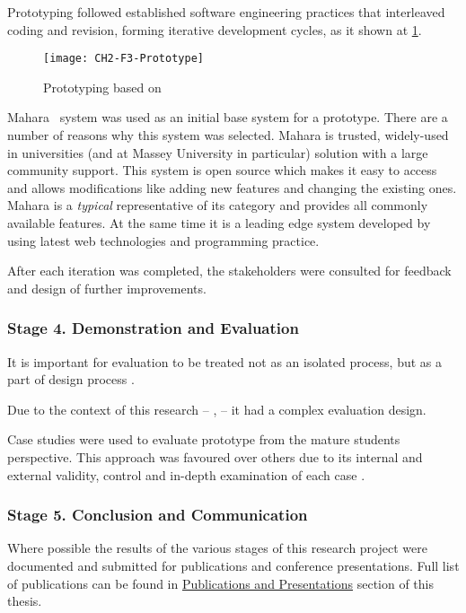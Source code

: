 Prototyping followed established software engineering practices that interleaved
coding and revision, forming iterative development cycles, as it shown at
\ref{fig:prototype}.

\begin{figure}[htb]
\centering
\texttt{[image: CH2-F3-Prototype]}
\caption[Ptototyping]{Prototyping based on \citet*[p.~411]{Sommerville2007}}
\label{fig:prototype}
\end{figure}

Mahara \ep~system was used as an initial base system for a prototype. There
are a number of reasons why this system was selected. Mahara is trusted,
widely-used in universities (and at Massey University in particular) solution
with a large community support. This system is open source which makes it easy
to access and allows modifications like adding new features and changing the
existing ones. Mahara is a \textit{typical} representative of its category and
provides all commonly available features. At the same time it is a leading edge
system developed by using latest web technologies and programming practice.

After each iteration was completed, the stakeholders were consulted for feedback
and design of further improvements. 



\subsubsection{Stage 4. Demonstration and Evaluation}

It is important for evaluation to be treated not as an isolated process, but as
a part of design process \citep{Cleven2009}.

Due to the context of this research -- \LLLsn, -- it had a complex evaluation
design. 

Case studies were used to evaluate prototype from the mature students
perspective. This approach was favoured over others due to its internal and
external validity, control and in-depth examination of each case
\citep{Yin2009}.

\subsubsection{Stage 5. Conclusion and Communication}

Where possible the results of the various stages of this research project were
documented and submitted for publications and conference presentations. Full
list of publications can be found in \hyperref[sec:pub]{Publications and
Presentations} section of this thesis.

